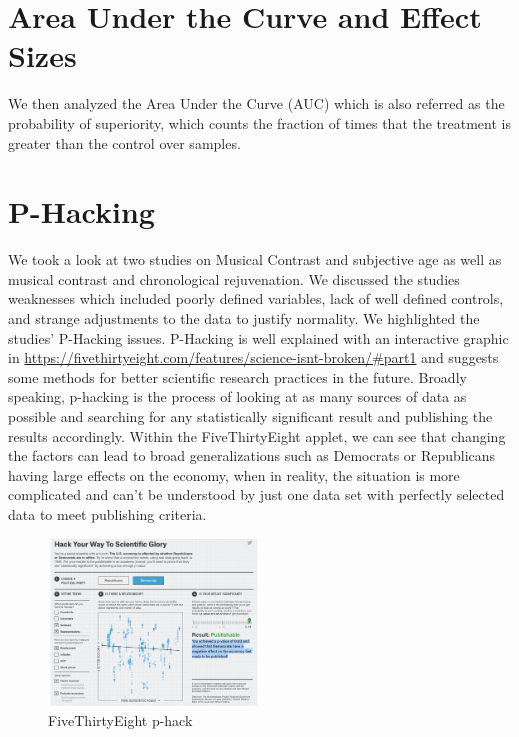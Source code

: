 \section{Area Under the Curve and Effect Sizes}

We then analyzed the Area Under the Curve (AUC) which is also referred as the probability of superiority, which counts the fraction of times that the treatment is greater than the control over samples. 

\section{P-Hacking}

We took a look at two studies on Musical Contrast and subjective age as well as musical contrast and chronological rejuvenation. We discussed the studies weaknesses which included poorly defined variables, lack of well defined controls, and strange adjustments to the data to justify normality. We highlighted the studies' P-Hacking issues. P-Hacking is well explained with an interactive graphic in \url{https://fivethirtyeight.com/features/science-isnt-broken/#part1} and suggests some methods for better scientific research practices in the future. Broadly speaking, p-hacking is the process of looking at as many sources of data as possible and searching for any statistically significant result and publishing the results accordingly. Within the FiveThirtyEight applet, we can see that changing the factors can lead to broad generalizations such as Democrats or Republicans having large effects on the economy, when in reality, the situation is more complicated and can't be understood by just one data set with perfectly selected data to meet publishing criteria. 

\begin{figure}[ht]
  \begin{center}
    \includegraphics[width=0.5\textwidth]{figures/p_hack.png}
    \caption{
	FiveThirtyEight p-hack} 
    \label{fig:p_hack}
  \end{center}
\end{figure}

